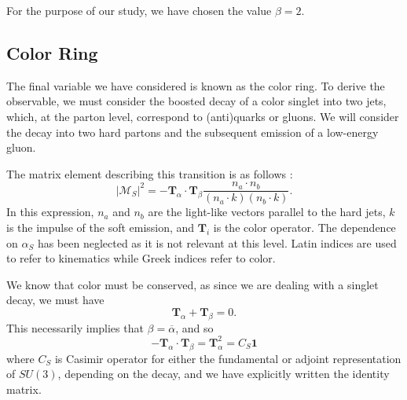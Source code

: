 \documentclass[10pt,a4paper]{book}
\begin{document}
For the purpose of our study, we have chosen the value $\beta = 2$.

\subsection{Color Ring}
The final variable we have considered is known as the color ring. To derive the observable, we must consider the boosted decay of a color singlet into two jets, which, at the parton level, correspond to (anti)quarks or gluons. We will consider the decay into two hard partons and the subsequent emission of a low-energy gluon.

The matrix element describing this transition is as follows \cite{Buckley:2020kdp}:
\begin{equation}
\vert \mathcal{M}_S \vert^2 = -\mathbf{T}_\alpha \cdot \mathbf{T}_\beta 	\frac{n_a \cdot n_b}{(n_a \cdot k)(n_b \cdot k)}.
\end{equation}
In this expression, $n_a$ and $n_b$ are the light-like vectors parallel to the hard jets, $k$ is the impulse of the soft emission, and $\mathbf{T}_i$ is the color operator. The dependence on $\alpha_S$ has been neglected as it is not relevant at this level. Latin indices are used to refer to kinematics while Greek indices refer to color.

We know that color must be conserved, as since we are dealing with a singlet decay, we must have
\begin{equation}
\mathbf{T}_\alpha + \mathbf{T}_\beta = 0.
\end{equation}
This necessarily implies that $\beta = \overline{\alpha}$, and so
\begin{equation}
-\mathbf{T}_\alpha \cdot \mathbf{T}_\beta = \mathbf{T}_\alpha^2 = C_S\mathbf{1}
\end{equation}
where $C_S$ is Casimir operator for either the fundamental or adjoint representation of $SU(3)$, depending on the decay, and we have explicitly written the identity matrix. 
\end{document}
